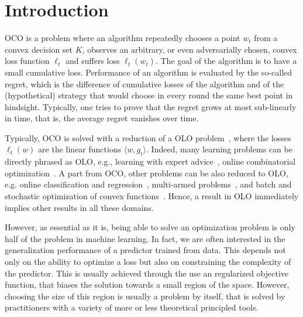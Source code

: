 \section{Introduction}
\ac{OCO} is a problem where an algorithm repeatedly chooses a point $w_t$ from a convex decision set $K$, observes an arbitrary, or even adversarially chosen, convex loss function $\ell_t$ and suffers loss $\ell_t(w_t)$. The goal of the algorithm is to have a small cumulative loss. Performance of an algorithm is evaluated by the so-called regret, which is the difference of cumulative losses of the algorithm and of the (hypothetical) strategy that would choose in every round the same best point in hindsight.
Typically, one tries to prove that the regret grows at most sub-linearly in time, that is, the average regret vanishes over time.

Typically, \ac{OCO} is solved with a reduction of a \ac{OLO} problem~\citep{Cesa-BianchiL06,Shalev-Shwartz12}, where the losses $\ell_t(w)$ are the linear functions $\langle w, g_t\rangle$.
Indeed, many learning problems can be directly phrased as \ac{OLO}, e.g., learning with expert advice~\citep{LittlestoneW94,Vovk98,Cesa-BianchiFHHSW97}, online combinatorial optimization~\cite{KoolenWK10}. A part from \ac{OCO}, other problems can be also reduced to \ac{OLO}, e.g. online classification and regression~\citep[Chapters~11~and~12]{Cesa-BianchiL06}, multi-armed problems~\citep[Chapter~6]{Cesa-BianchiL06}, and batch and stochastic optimization of convex functions~\cite{NemirovskyY83}.  Hence, a result in \ac{OLO} immediately implies other results in all these domains.

However, as essential as it is, being able to solve an optimization problem is only half of the problem in machine learning. In fact, we are often interested in the generalization performance of a predictor trained from data. This depends not only on the ability to optimize a loss but also on constraining the complexity of the predictor. This is usually achieved through the use an regularized objective function, that biases the solution towards a small region of the space. However, choosing the size of this region is usually a problem by itself, that is solved by practitioners with a variety of more or less theoretical principled tools.

